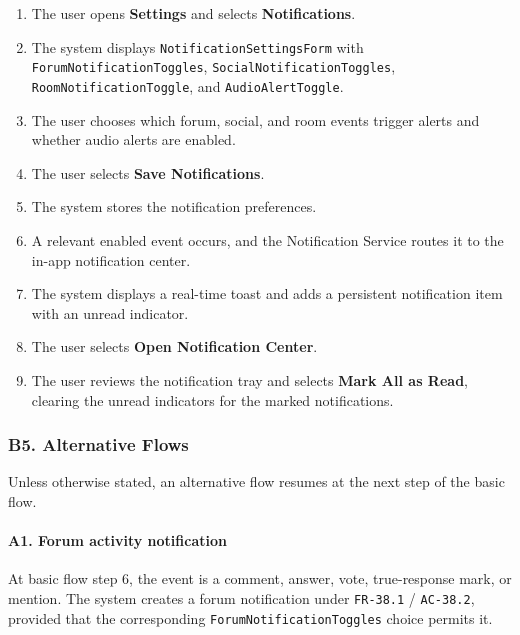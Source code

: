 \documentclass[12pt]{article}
\begin{document}
\begin{enumerate}
\item The user opens \textbf{Settings} and selects \textbf{Notifications}.
\item The system displays \texttt{NotificationSettingsForm} with \texttt{ForumNotificationToggles}, \texttt{SocialNotificationToggles}, \texttt{RoomNotificationToggle}, and \texttt{AudioAlertToggle}.
\item The user chooses which forum, social, and room events trigger alerts and whether audio alerts are enabled.
\item The user selects \textbf{Save Notifications}.
\item The system stores the notification preferences.
\item A relevant enabled event occurs, and the Notification Service routes it to the in-app notification center.
\item The system displays a real-time toast and adds a persistent notification item with an unread indicator.
\item The user selects \textbf{Open Notification Center}.
\item The user reviews the notification tray and selects \textbf{Mark All as Read}, clearing the unread indicators for the marked notifications.
\end{enumerate}
\par\medskip

\hypertarget{sec:b5-alternative-flows}{}
\subsubsection*{B5. Alternative Flows}
\par\medskip

Unless otherwise stated, an alternative flow resumes at the next step of the basic flow.
\par\medskip

\hypertarget{sec:a1-forum-activity-notification}{}
\paragraph*{A1. Forum activity notification}
\par\medskip

At basic flow step 6, the event is a comment, answer, vote, true-response mark, or mention. The system creates a forum notification under \texttt{FR-38.1} / \texttt{AC-38.2}, provided that the corresponding \texttt{ForumNotificationToggles} choice permits it.
\par\medskip
\end{document}

